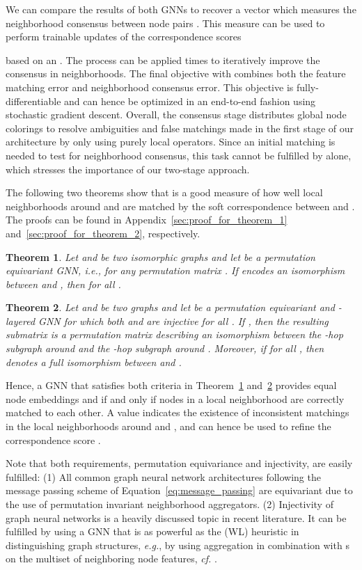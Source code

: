 \documentclass{article}
\def\eg{\emph{e.g.}} \def\Eg{\emph{E.g.}}  \def\ie{\emph{i.e.}} \def\Ie{\emph{I.e.}}  \def\cf{\emph{cf.}}  \def\Cf{\emph{Cf.}}
\newtheorem{theorem}{Theorem}
\begin{document}
We can compare the results of both GNNs to recover a vector  which measures the neighborhood consensus between node pairs .
This measure can be used to perform trainable updates of the correspondence scores

based on an  .
The process can be applied  times to iteratively improve the consensus in neighborhoods.
The final objective  with  combines both the feature matching error and neighborhood consensus error.
This objective is fully-differentiable and can hence be optimized in an end-to-end fashion using stochastic gradient descent.
Overall, the consensus stage distributes global node colorings to resolve ambiguities and false matchings made in the first stage of our architecture by only using purely local operators.
Since an initial matching is needed to test for neighborhood consensus, this task cannot be fulfilled by  alone, which stresses the importance of our two-stage approach.

The following two theorems show that  is a good measure of how well local neighborhoods around  and  are matched by the soft correspondence between  and .
The proofs can be found in Appendix~\ref{sec:proof_for_theorem_1} and~\ref{sec:proof_for_theorem_2}, respectively.

\begin{theorem}\label{theorem:theorem1}
  Let  and  be two isomorphic graphs and let  be a permutation equivariant GNN, \ie,  for any permutation matrix .
  If  encodes an isomorphism between  and , then  for all .
\end{theorem}

\begin{theorem}\label{theorem:theorem2}
  Let  and  be two graphs and let  be a permutation equivariant and -layered GNN for which both  and  are injective for all .
  If , then the resulting submatrix  is a permutation matrix describing an isomorphism between the -hop subgraph  around  and the -hop subgraph  around .
  Moreover, if  for all , then  denotes a full isomorphism between  and .
\end{theorem}

Hence, a GNN  that satisfies both criteria in Theorem~\ref{theorem:theorem1} and~\ref{theorem:theorem2} provides equal node embeddings  and  if and only if nodes in a local neighborhood are correctly matched to each other.
A value  indicates the existence of inconsistent matchings in the local neighborhoods around  and , and can hence be used to refine the correspondence score .

Note that both requirements, permutation equivariance and injectivity, are easily fulfilled: (1) All common graph neural network architectures following the message passing scheme of Equation~\eqref{eq:message_passing} are equivariant due to the use of permutation invariant neighborhood aggregators.
(2) Injectivity of graph neural networks is a heavily discussed topic in recent literature.
It can be fulfilled by using a GNN that is as powerful as the \citet{Weisfeiler/Lehman/1968} (WL) heuristic in distinguishing graph structures, \eg{}, by using  aggregation in combination with s on the multiset of neighboring node features, \cf{} \citep{Xu/etal/2019b,Morris/etal/2019}.
\end{document}
